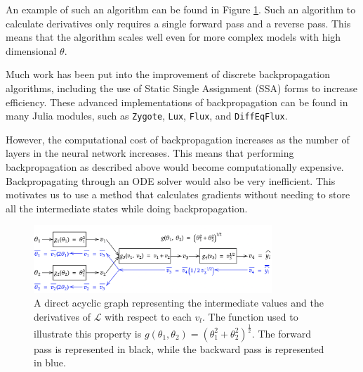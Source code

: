 \documentclass[a4paper,11pt,titlepage]{article}
\theoremstyle{definition}
\theoremstyle{plain}
\theoremstyle{remark}
\begin{document}
An example of such an algorithm can be found in Figure \ref{fig:discretebackprop}. Such an algorithm to calculate derivatives only requires a single forward pass and a reverse pass. This means that the algorithm scales well even for more complex models with high dimensional $\theta$. \cite{ketkar2017}

Much work has been put into the improvement of discrete backpropagation algorithms, including the use of Static Single Assignment (SSA) forms to increase efficiency. \cite{innes2019} These advanced implementations of backpropagation can be found in many Julia modules, such as \texttt{Zygote}, \texttt{Lux}, \texttt{Flux}, and \texttt{DiffEqFlux}. %


However, the computational cost of backpropagation increases as the number of layers in the neural network increases. This means that performing backpropagation as described above would become computationally expensive. Backpropagating through an ODE solver would also be very inefficient. This motivates us to use a method that calculates gradients without needing to store all the intermediate states while doing backpropagation.

\begin{figure}\label{discretebackprop}
    \centering
    \includegraphics[width=0.8\textwidth]{report/figures/backpropdiscrete.png}
    \caption{A direct acyclic graph representing the intermediate values and the derivatives of $\mathcal{L}$ with respect to each $v_l$. The function used to illustrate this property is $g(\theta_1, \theta_2) = (\theta_1^2 + \theta_2^2)^\frac{1}{2}$. The forward pass is represented in black, while the backward pass is represented in blue.}
    \label{fig:discretebackprop}
\end{figure}
\end{document}
